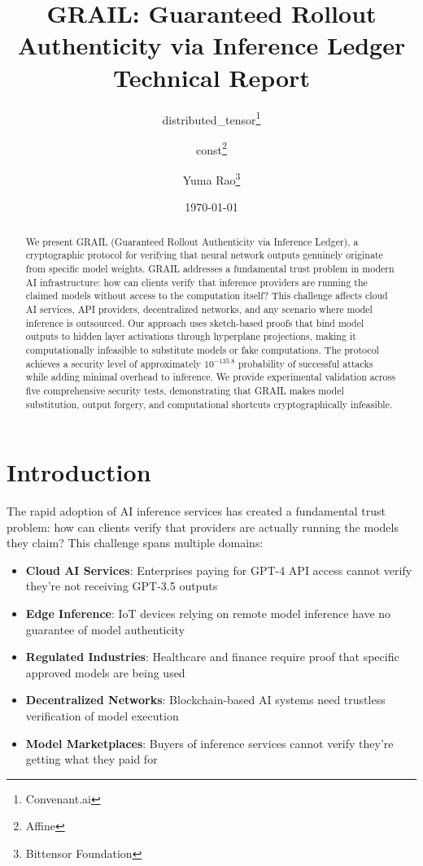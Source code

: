 \documentclass[11pt,a4paper]{article}
\title{\Large \textbf{GRAIL: Guaranteed Rollout Authenticity via Inference Ledger}\\
\vspace{0.5em}
\large Technical Report}
\author{
distributed\_tensor\thanks{Convenant.ai} \and 
const\thanks{Affine} \and 
Yuma Rao\thanks{Bittensor Foundation}
}
\date{\today}
\begin{document}
\maketitle

\begin{abstract}
We present GRAIL (Guaranteed Rollout Authenticity via Inference Ledger), a cryptographic protocol for verifying that neural network outputs genuinely originate from specific model weights. GRAIL addresses a fundamental trust problem in modern AI infrastructure: how can clients verify that inference providers are running the claimed models without access to the computation itself? This challenge affects cloud AI services, API providers, decentralized networks, and any scenario where model inference is outsourced. Our approach uses sketch-based proofs that bind model outputs to hidden layer activations through hyperplane projections, making it computationally infeasible to substitute models or fake computations. The protocol achieves a security level of approximately $10^{-135.8}$ probability of successful attacks while adding minimal overhead to inference. We provide experimental validation across five comprehensive security tests, demonstrating that GRAIL makes model substitution, output forgery, and computational shortcuts cryptographically infeasible.
\end{abstract}

\section{Introduction}

The rapid adoption of AI inference services has created a fundamental trust problem: how can clients verify that providers are actually running the models they claim? This challenge spans multiple domains:

\begin{itemize}
    \item \textbf{Cloud AI Services}: Enterprises paying for GPT-4 API access cannot verify they're not receiving GPT-3.5 outputs
    \item \textbf{Edge Inference}: IoT devices relying on remote model inference have no guarantee of model authenticity
    \item \textbf{Regulated Industries}: Healthcare and finance require proof that specific approved models are being used
    \item \textbf{Decentralized Networks}: Blockchain-based AI systems need trustless verification of model execution
    \item \textbf{Model Marketplaces}: Buyers of inference services cannot verify they're getting what they paid for
\end{itemize}
\end{document}
